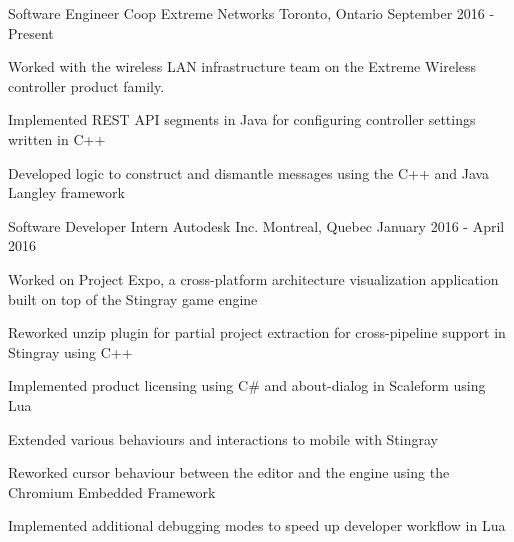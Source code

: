 


\begin{cventries}


\cventry
{Software Engineer Coop}
{Extreme Networks}
{Toronto, Ontario}
{September 2016 - Present}
{ %
Worked with the wireless LAN infrastructure team on the Extreme Wireless controller product family.
\begin{cvitems}
\item[]
\item {Implemented REST API segments in Java for configuring controller settings written in C++}
\item {Developed logic to construct and dismantle messages using the C++ and Java Langley framework}
\end{cvitems}
}


\cventry
{Software Developer Intern}
{Autodesk Inc.}
{Montreal, Quebec}
{January 2016 - April 2016}
{ %
Worked on Project Expo, a cross-platform architecture visualization application built on top of the Stingray game engine
\begin{cvitems}
\item[]
\item {Reworked unzip plugin for partial project extraction for cross-pipeline support in Stingray using C++}
\item {Implemented product licensing using C\# and about-dialog in Scaleform using Lua}
\item {Extended various behaviours and interactions to mobile with Stingray}
\item {Reworked cursor behaviour between the editor and the engine using the Chromium Embedded Framework}
\item {Implemented additional debugging modes to speed up developer workflow in Lua}
\end{cvitems}
}


\end{cventries}
